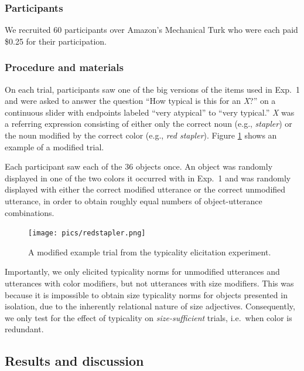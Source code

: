 \documentclass[11pt]{article}
\newcommand{\figref}[1]{Figure \ref{#1}}
\begin{document}
\subsubsection{Participants}

We recruited 60 participants over Amazon's Mechanical Turk who were each paid \$0.25 for their participation.

\subsubsection{Procedure and materials}

On each trial, participants saw one of the big versions of the items used in Exp.~1 and were asked to answer the question ``How typical is this for an \emph{X}?'' on a continuous slider with endpoints labeled ``very atypical'' to ``very typical.'' \emph{X} was a referring expression consisting of either only the correct noun (e.g., \emph{stapler}) or the noun modified by the correct color (e.g., \emph{red stapler}). \figref{fig:modifiertypstimulus} shows an example of a modified trial.

Each participant saw each of the 36 objects once. An object was randomly displayed in one of the two colors it occurred with in Exp.~1 and was randomly displayed with either the correct modified utterance or the correct unmodified utterance, in order to obtain roughly equal numbers of object-utterance combinations.

\begin{figure}
\centering
\texttt{[image: pics/redstapler.png]}
\caption{A modified example trial from the typicality elicitation experiment.}
\label{fig:modifiertypstimulus}
\end{figure}

Importantly, we only elicited typicality norms for unmodified utterances and utterances with color modifiers, but not utterances with size modifiers. This was because it is impossible to obtain size typicality norms for objects presented in isolation, due to the inherently relational nature of size adjectives. Consequently, we only test for the effect of typicality on \emph{size-sufficient} trials, i.e.~when color is redundant. 

\subsection{Results and discussion}
\end{document}

